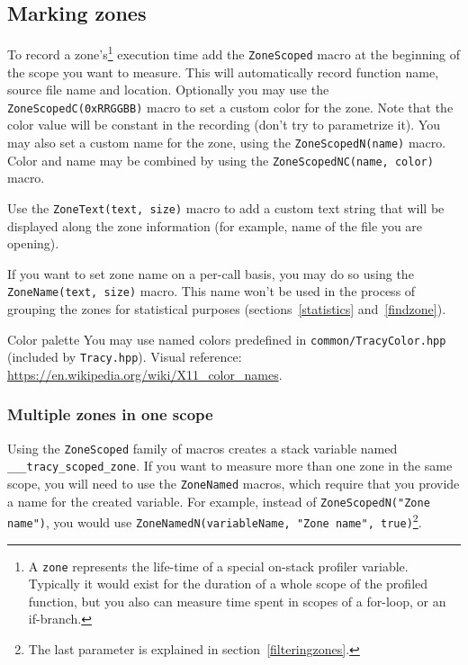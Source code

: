 \documentclass[hidelinks,titlepage,a4paper]{article}
\begin{document}
\subsection{Marking zones}
\label{markingzones}

To record a zone's\footnote{A \texttt{zone} represents the life-time of a special on-stack profiler variable. Typically it would exist for the duration of a whole scope of the profiled function, but you also can measure time spent in scopes of a for-loop, or an if-branch.} execution time add the \texttt{ZoneScoped} macro at the beginning of the scope you want to measure. This will automatically record function name, source file name and location. Optionally you may use the \texttt{ZoneScopedC(0xRRGGBB)} macro to set a custom color for the zone. Note that the color value will be constant in the recording (don't try to parametrize it). You may also set a custom name for the zone, using the \texttt{ZoneScopedN(name)} macro. Color and name may be combined by using the \texttt{ZoneScopedNC(name, color)} macro.

Use the \texttt{ZoneText(text, size)} macro to add a custom text string that will be displayed along the zone information (for example, name of the file you are opening).

If you want to set zone name on a per-call basis, you may do so using the \texttt{ZoneName(text, size)} macro. This name won't be used in the process of grouping the zones for statistical purposes (sections~\ref{statistics} and~\ref{findzone}).

\begin{bclogo}[
noborder=true,
couleur=black!5,
logo=\bclampe
]{Color palette}
You may use named colors predefined in \texttt{common/TracyColor.hpp} (included by \texttt{Tracy.hpp}). Visual reference: \url{https://en.wikipedia.org/wiki/X11_color_names}.
\end{bclogo}

\subsubsection{Multiple zones in one scope}
\label{multizone}

Using the \texttt{ZoneScoped} family of macros creates a stack variable named \texttt{\_\_\_tracy\_scoped\_zone}. If you want to measure more than one zone in the same scope, you will need to use the \texttt{ZoneNamed} macros, which require that you provide a name for the created variable. For example, instead of \texttt{ZoneScopedN("Zone name")}, you would use \texttt{ZoneNamedN(variableName, "Zone name", true)}\footnote{The last parameter is explained in section~\ref{filteringzones}.}.
\end{document}
